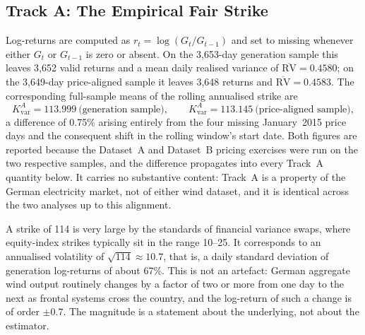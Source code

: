 \documentclass[11pt, a4paper, twoside]{article}
\begin{document}
\subsection{Track A: The Empirical Fair Strike}
\label{sec:tracka}

Log-returns are computed as $r_t = \log(G_t/G_{t-1})$ and set to missing whenever either $G_t$ or $G_{t-1}$ is zero or absent. On the 3{,}653-day generation sample this leaves 3{,}652 valid returns and a mean daily realised variance of $\overline{\mathrm{RV}} = 0.4580$; on the 3{,}649-day price-aligned sample it leaves 3{,}648 returns and $\overline{\mathrm{RV}} = 0.4583$. The corresponding full-sample means of the rolling annualised strike are
\begin{equation}
K_{\text{var}}^A = 113.999 \ \text{(generation sample)}, \qquad
K_{\text{var}}^A = 113.145 \ \text{(price-aligned sample)},
\end{equation}
a difference of 0.75\% arising entirely from the four missing January~2015 price days and the consequent shift in the rolling window's start date. Both figures are reported because the Dataset~A and Dataset~B pricing exercises were run on the two respective samples, and the difference propagates into every Track~A quantity below. It carries no substantive content: Track~A is a property of the German electricity market, not of either wind dataset, and it is identical across the two analyses up to this alignment.

A strike of 114 is very large by the standards of financial variance swaps, where equity-index strikes typically sit in the range 10--25. It corresponds to an annualised volatility of $\sqrt{114} \approx 10.7$, that is, a daily standard deviation of generation log-returns of about 67\%. This is not an artefact: German aggregate wind output routinely changes by a factor of two or more from one day to the next as frontal systems cross the country, and the log-return of such a change is of order $\pm 0.7$. The magnitude is a statement about the underlying, not about the estimator.
\end{document}
